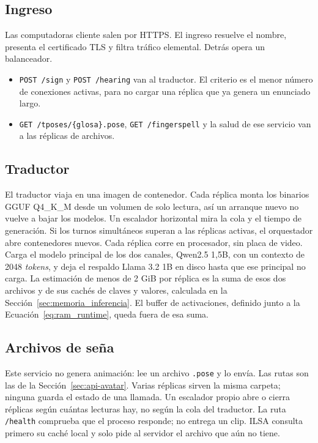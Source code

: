 \subsection{Ingreso}
Las computadoras cliente salen por HTTPS. El ingreso resuelve el nombre, presenta el certificado TLS y filtra tráfico elemental. Detrás opera un balanceador.
\begin{itemize}
    \item \texttt{POST /sign} y \texttt{POST /hearing} van al traductor. El criterio es el menor número de conexiones activas, para no cargar una réplica que ya genera un enunciado largo.
    \item \texttt{GET /tposes/\{glosa\}.pose}, \texttt{GET /fingerspell} y la salud de ese servicio van a las réplicas de archivos.
\end{itemize}

\subsection{Traductor}
El traductor viaja en una imagen de contenedor. Cada réplica monta los binarios GGUF Q4\_K\_M desde un volumen de solo lectura, así un arranque nuevo no vuelve a bajar los modelos. Un escalador horizontal mira la cola y el tiempo de generación. Si los turnos simultáneos superan a las réplicas activas, el orquestador abre contenedores nuevos. Cada réplica corre en procesador, sin placa de video. Carga el modelo principal de los dos canales, Qwen2.5 1,5B, con un contexto de 2048 \textit{tokens}, y deja el respaldo Llama 3.2 1B en disco hasta que ese principal no carga. La estimación de menos de 2 GiB por réplica es la suma de esos dos archivos y de sus cachés de claves y valores, calculada en la Sección~\ref{sec:memoria_inferencia}. El buffer de activaciones, definido junto a la Ecuación~\ref{eq:ram_runtime}, queda fuera de esa suma.

\subsection{Archivos de seña}
Este servicio no genera animación: lee un archivo \texttt{.pose} y lo envía. Las rutas son las de la Sección~\ref{sec:api-avatar}. Varias réplicas sirven la misma carpeta; ninguna guarda el estado de una llamada. Un escalador propio abre o cierra réplicas según cuántas lecturas hay, no según la cola del traductor. La ruta \texttt{/health} comprueba que el proceso responde; no entrega un clip. ILSA consulta primero su caché local y solo pide al servidor el archivo que aún no tiene.

